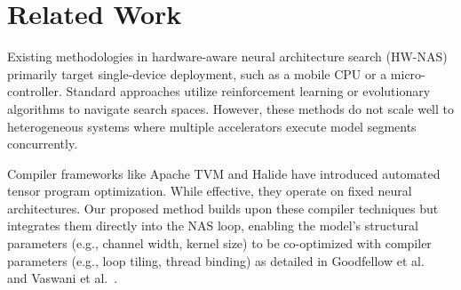 \section{Related Work}
Existing methodologies in hardware-aware neural architecture search (HW-NAS) primarily target single-device deployment, such as a mobile CPU or a micro-controller. Standard approaches utilize reinforcement learning or evolutionary algorithms to navigate search spaces. However, these methods do not scale well to heterogeneous systems where multiple accelerators execute model segments concurrently.

Compiler frameworks like Apache TVM and Halide have introduced automated tensor program optimization. While effective, they operate on fixed neural architectures. Our proposed method builds upon these compiler techniques but integrates them directly into the NAS loop, enabling the model's structural parameters (e.g., channel width, kernel size) to be co-optimized with compiler parameters (e.g., loop tiling, thread binding) as detailed in Goodfellow et al.~\cite{goodfellow2016deep} and Vaswani et al.~\cite{vaswani2017attention}.
